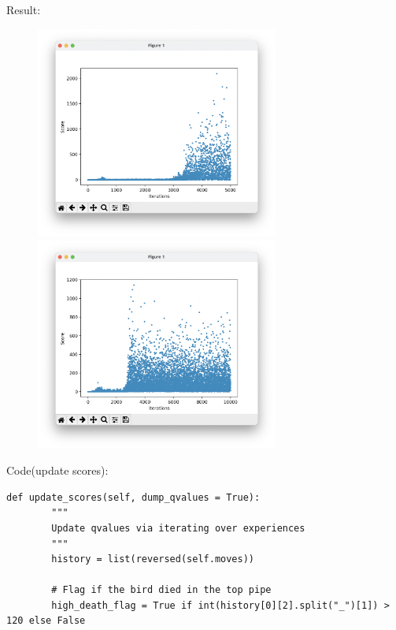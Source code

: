 \documentclass[a4paper, 11pt]{article}
\begin{document}
\begin{enumerate}
	Result:
	\begin{figure}[ht]
		\centering
		\includegraphics[width=8cm]{2.png}
		\quad
		\includegraphics[width=8cm]{3.png}
	\end{figure}
	
Code(update scores):
\begin{lstlisting}
def update_scores(self, dump_qvalues = True):
        """
        Update qvalues via iterating over experiences
        """
        history = list(reversed(self.moves))

        # Flag if the bird died in the top pipe
        high_death_flag = True if int(history[0][2].split("_")[1]) > 120 else False


\end{lstlisting}
\end{enumerate}
\end{document}
